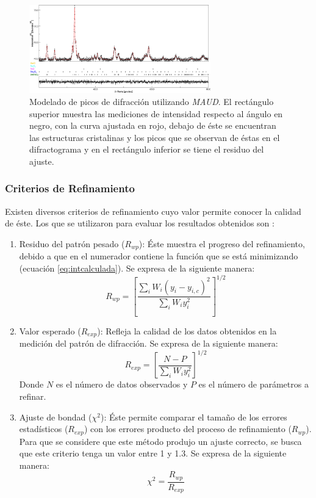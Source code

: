\documentclass[../main.tex]{subfiles}
\begin{document}
\begin{figure}[H]
    \centering
    \includegraphics[width=0.7\textwidth]{fig/Rietveld.png}
    \caption{Modelado de picos de difracción utilizando \textit{MAUD}. El rectángulo superior muestra las mediciones de intensidad respecto al ángulo en negro, con la curva ajustada en rojo, debajo de éste se encuentran las estructuras cristalinas y los picos que se observan de éstas en el difractograma y en el rectángulo inferior se tiene el residuo del ajuste.}
    \label{fig:picosrietveld}
\end{figure}
\subsubsection{Criterios de Refinamiento} \label{sec:refinamiento}
Existen diversos criterios de refinamiento cuyo valor permite conocer la calidad de éste. Los que se utilizaron para evaluar los resultados obtenidos son \cite{Rietveld}:
\begin{enumerate}[label=\textbf{\alph*)}]
    \item Residuo del patrón pesado ($R_{wp}$): Éste muestra el progreso del refinamiento, debido a que en el numerador contiene la función que se está minimizando (ecuación \ref{eq:intcalculada}). Se expresa de la siguiente manera:
    \begin{equation}
        R_{wp}=\left[\dfrac{\sum_i W_i\left(y_i-y_{i,c}\right)^2}{\sum_i W_i y_i^2}\right]^{1/2}
        \label{eq:patronpesado}
    \end{equation}
    \item Valor esperado ($R_{exp}$): Refleja la calidad de los datos obtenidos en la medición del patrón de difracción. Se expresa de la siguiente manera:
    \begin{equation}
        R_{exp}=\left[\dfrac{N-P}{\sum_i W_i y_i^2}\right]^{1/2}
        \label{eq:valoresperado}
    \end{equation}
    Donde $N$ es el número de datos observados y $P$ es el número de parámetros a refinar.
    \item Ajuste de bondad ($\chi^2$): Éste permite comparar el tamaño de los errores estadísticos ($R_{exp}$) con los errores producto del proceso de refinamiento ($R_{wp}$). Para que se considere que este método produjo un ajuste correcto, se busca que este criterio tenga un valor entre 1 y 1.3. Se expresa de la siguiente manera:
    \begin{equation}
        \chi^2=\dfrac{R_{wp}}{R_{exp}}
        \label{eq:ajustebondad}
    \end{equation}
\end{enumerate}
\end{document}
